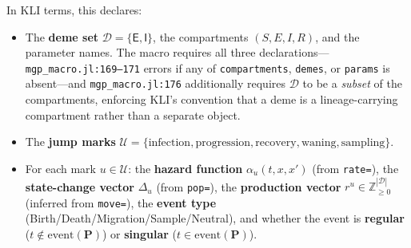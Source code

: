 \documentclass[11pt,leqno]{article}
\renewcommand{\Pr}{\mathbf{P}}      %
\newcommand{\Jumps}{\mathcal{U}}    %
\newcommand{\Demes}{\mathcal{D}}    %
\newcommand{\Zp}{\mathbb{Z}_{\ge 0}}
\newcommand{\code}[1]{\texttt{#1}}
\newcommand{\deme}[1]{\mathsf{#1}}
\theoremstyle{plain}
\theoremstyle{definition}
\begin{document}
In KLI terms, this declares:
\begin{itemize}
  \item The \textbf{deme set} $\Demes = \{\deme{E}, \deme{I}\}$, the
    compartments $(S,E,I,R)$, and the parameter names.  The macro requires
    all three declarations---\code{mgp\_macro.jl:169--171} errors if any of
    \code{compartments}, \code{demes}, or \code{params} is absent---and
    \code{mgp\_macro.jl:176} additionally requires $\Demes$ to be a
    \emph{subset} of the compartments, enforcing KLI's convention that a
    deme is a lineage-carrying compartment rather than a separate object.
  \item The \textbf{jump marks} $\Jumps =
    \{\text{infection}, \text{progression}, \text{recovery},
    \text{waning}, \text{sampling}\}$.
  \item For each mark $u \in \Jumps$:
    the \textbf{hazard function} $\alpha_u(t,x,x')$
    (from \code{rate=}),
    the \textbf{state-change vector} $\Delta_u$
    (from \code{pop=}),
    the \textbf{production vector} $r^u \in \Zp^{|\Demes|}$
    (inferred from \code{move=}),
    the \textbf{event type} (Birth/Death/Migration/Sample/Neutral),
    and whether the event is \textbf{regular} ($t \notin \mathrm{event}(\Pr)$)
    or \textbf{singular} ($t \in \mathrm{event}(\Pr)$).
\end{itemize}
\end{document}
